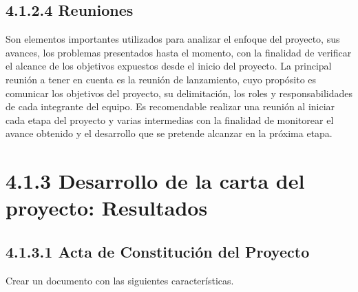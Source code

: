 \documentclass[letterpaper,12pt,openright,oneside]{article}
\theoremstyle{plain}
\begin{document}
\subsection*{4.1.2.4 Reuniones}

Son elementos importantes utilizados para analizar el enfoque del proyecto, sus avances, los problemas presentados hasta el momento, con la finalidad de verificar el alcance de los objetivos expuestos desde el inicio del proyecto.
La principal reunión a tener en cuenta es la reunión de lanzamiento, cuyo propósito es comunicar los objetivos del proyecto, su delimitación, los roles y responsabilidades de cada integrante del equipo.
Es recomendable realizar una reunión al iniciar cada etapa del proyecto y varias intermedias con la finalidad de monitorear el avance obtenido y el desarrollo que se pretende alcanzar en la próxima etapa.

% 
%
\section*{4.1.3 Desarrollo de la carta del proyecto: Resultados}

% 
%
\subsection*{4.1.3.1 Acta de Constitución del Proyecto}

Crear un documento con las siguientes características.
\end{document}
